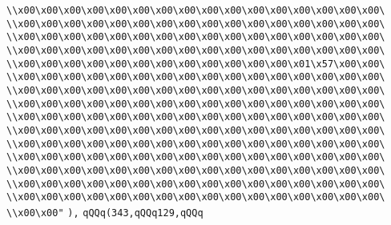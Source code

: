 \verb|\\x00\x00\x00\x00\x00\x00\x00\x00\x00\x00\x00\x00\x00\x00\x00\x00\|\newline
\verb|\\x00\x00\x00\x00\x00\x00\x00\x00\x00\x00\x00\x00\x00\x00\x00\x00\|\newline
\verb|\\x00\x00\x00\x00\x00\x00\x00\x00\x00\x00\x00\x00\x00\x00\x00\x00\|\newline
\verb|\\x00\x00\x00\x00\x00\x00\x00\x00\x00\x00\x00\x00\x00\x00\x00\x00\|\newline
\verb|\\x00\x00\x00\x00\x00\x00\x00\x00\x00\x00\x00\x00\x01\x57\x00\x00\|\newline
\verb|\\x00\x00\x00\x00\x00\x00\x00\x00\x00\x00\x00\x00\x00\x00\x00\x00\|\newline
\verb|\\x00\x00\x00\x00\x00\x00\x00\x00\x00\x00\x00\x00\x00\x00\x00\x00\|\newline
\verb|\\x00\x00\x00\x00\x00\x00\x00\x00\x00\x00\x00\x00\x00\x00\x00\x00\|\newline
\verb|\\x00\x00\x00\x00\x00\x00\x00\x00\x00\x00\x00\x00\x00\x00\x00\x00\|\newline
\verb|\\x00\x00\x00\x00\x00\x00\x00\x00\x00\x00\x00\x00\x00\x00\x00\x00\|\newline
\verb|\\x00\x00\x00\x00\x00\x00\x00\x00\x00\x00\x00\x00\x00\x00\x00\x00\|\newline
\verb|\\x00\x00\x00\x00\x00\x00\x00\x00\x00\x00\x00\x00\x00\x00\x00\x00\|\newline
\verb|\\x00\x00\x00\x00\x00\x00\x00\x00\x00\x00\x00\x00\x00\x00\x00\x00\|\newline
\verb|\\x00\x00\x00\x00\x00\x00\x00\x00\x00\x00\x00\x00\x00\x00\x00\x00\|\newline
\verb|\\x00\x00\x00\x00\x00\x00\x00\x00\x00\x00\x00\x00\x00\x00\x00\x00\|\newline
\verb|\\x00\x00"|\newline
\verb|),|\newline
\verb|qQQq(343,qQQq129,qQQq|\newline
